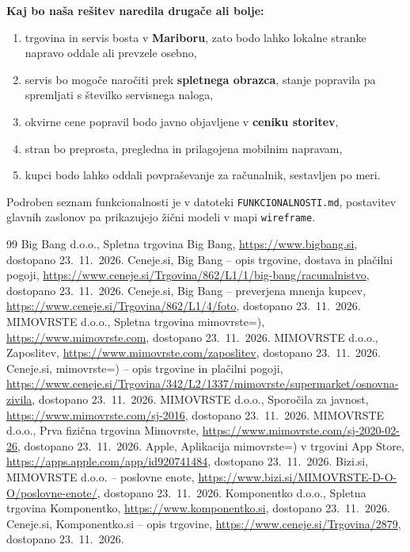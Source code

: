 \documentclass[11pt,a4paper]{article}
\begin{document}
\textbf{Kaj bo naša rešitev naredila drugače ali bolje:}
\begin{enumerate}
\item trgovina in servis bosta v \textbf{Mariboru}, zato bodo lahko lokalne stranke napravo oddale ali prevzele osebno,
\item servis bo mogoče naročiti prek \textbf{spletnega obrazca}, stanje popravila pa spremljati s številko servisnega naloga,
\item okvirne cene popravil bodo javno objavljene v \textbf{ceniku storitev},
\item stran bo preprosta, pregledna in prilagojena mobilnim napravam,
\item kupci bodo lahko oddali povpraševanje za računalnik, sestavljen po meri.
\end{enumerate}

Podroben seznam funkcionalnosti je v datoteki \texttt{FUNKCIONALNOSTI.md}, postavitev
glavnih zaslonov pa prikazujejo žični modeli v mapi \texttt{wireframe}.

\begin{thebibliography}{99}
 Big Bang d.o.o., Spletna trgovina Big Bang, \url{https://www.bigbang.si}, dostopano 23.~11.~2026.
 Ceneje.si, Big Bang -- opis trgovine, dostava in plačilni pogoji, \url{https://www.ceneje.si/Trgovina/862/L1/1/big-bang/racunalnistvo}, dostopano 23.~11.~2026.
 Ceneje.si, Big Bang -- preverjena mnenja kupcev, \url{https://www.ceneje.si/Trgovina/862/L1/4/foto}, dostopano 23.~11.~2026.
 MIMOVRSTE d.o.o., Spletna trgovina mimovrste=), \url{https://www.mimovrste.com}, dostopano 23.~11.~2026.
 MIMOVRSTE d.o.o., Zaposlitev, \url{https://www.mimovrste.com/zaposlitev}, dostopano 23.~11.~2026.
 Ceneje.si, mimovrste=) -- opis trgovine in plačilni pogoji, \url{https://www.ceneje.si/Trgovina/342/L2/1337/mimovrste/supermarket/osnovna-zivila}, dostopano 23.~11.~2026.
 MIMOVRSTE d.o.o., Sporočila za javnost, \url{https://www.mimovrste.com/sj-2016}, dostopano 23.~11.~2026.
 MIMOVRSTE d.o.o., Prva fizična trgovina Mimovrste, \url{https://www.mimovrste.com/sj-2020-02-26}, dostopano 23.~11.~2026.
 Apple, Aplikacija mimovrste=) v trgovini App Store, \url{https://apps.apple.com/app/id920741484}, dostopano 23.~11.~2026.
 Bizi.si, MIMOVRSTE d.o.o. -- poslovne enote, \url{https://www.bizi.si/MIMOVRSTE-D-O-O/poslovne-enote/}, dostopano 23.~11.~2026.
 Komponentko d.o.o., Spletna trgovina Komponentko, \url{https://www.komponentko.si}, dostopano 23.~11.~2026.
 Ceneje.si, Komponentko.si -- opis trgovine, \url{https://www.ceneje.si/Trgovina/2879}, dostopano 23.~11.~2026.
\end{thebibliography}
\end{document}
